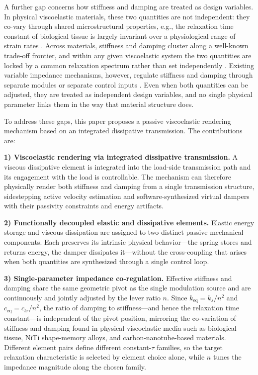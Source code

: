 ﻿\documentclass[conference]{IEEEtran}
\begin{document}
A further gap concerns how stiffness and damping are treated as design
variables. In physical viscoelastic materials, these two quantities are not
independent: they co-vary through shared microstructural properties, e.g.,
the relaxation time constant of biological tissue is largely invariant over a
physiological range of strain rates \cite{fun1980biomechanics}. Across
materials, stiffness and damping cluster along a well-known trade-off
frontier, and within any given viscoelastic system the two quantities are
locked by a common relaxation spectrum rather than set independently
\cite{unwin2018escaping,tsimouri2024lightweight}. Existing
variable impedance mechanisms, however, regulate stiffness and damping
through separate modules or separate control inputs \cite{vanderborght2013variable}.
Even when both quantities can be adjusted, they are treated as independent
design variables, and no single physical parameter links them in the way
that material structure does.

To address these gaps, this paper proposes a passive viscoelastic rendering
mechanism based on an integrated dissipative transmission. The contributions
are:

\textbf{1) Viscoelastic rendering via integrated dissipative transmission.}
A viscous dissipative element is integrated into the load-side transmission
path and its engagement with the load is controllable. The mechanism can
therefore physically render both stiffness and damping from a single
transmission structure, sidestepping active velocity estimation and
software-synthesized virtual dampers with their passivity constraints and
energy artifacts.

\textbf{2) Functionally decoupled elastic and dissipative elements.}
Elastic energy storage and viscous dissipation are assigned to two distinct
passive mechanical components. Each preserves its intrinsic physical
behavior---the spring stores and returns energy, the damper dissipates
it---without the cross-coupling that arises when both quantities are
synthesized through a single control loop.

\textbf{3) Single-parameter impedance co-regulation.}
Effective stiffness and damping share the same geometric pivot as the single
modulation source and are continuously and jointly adjusted by the lever
ratio $n$. Since $k_{\mathrm{eq}}=k_s/n^{2}$ and
$c_{\mathrm{eq}}=c_{tr}/n^{2}$, the ratio of damping to
stiffness---and hence the relaxation time constant---is independent of the
pivot position, mirroring the
co-variation of stiffness and damping found in physical viscoelastic media
such as biological tissue, NiTi shape-memory alloys, and carbon-nanotube-based
materials. Different element pairs define different constant-$\tau$ families,
so the target relaxation characteristic is selected by element choice alone,
while $n$ tunes the impedance magnitude along the chosen family.
\end{document}
